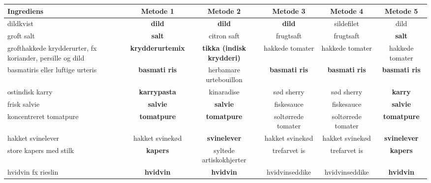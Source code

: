 \begin{table}
    \begin{tabular}{|p{2cm}|c|c|c|c|c|}
        \hline
        Ingrediens                                                 & Metode 1        & Metode 2                & Metode 3           & Metode 4           & Metode 5        \\ \hline
        dildkvist                                                  & \textbf{dild}            & \textbf{dild}                    & \textbf{dild}               & sildefilet         & dild            \\ \hline
        groft salt                                                 & \textbf{salt}            & citron saft             & frugtsaft          & frugtsaft          & \textbf{salt}            \\ \hline
        grofthakkede krydderurter, fx koriander, persille og dild & \textbf{krydderurtemix}  & \textbf{tikka (indisk krydderi)} & hakkede tomater    & hakkede tomater    & hakkede tomater \\ \hline
        basmatiris eller luftige urteris                           & \textbf{basmati ris}     & herbamare urtebouillon  & \textbf{basmati ris}        & \textbf{basmati ris}        & \textbf{basmati ris}     \\ \hline
        ostindisk karry                                            & \textbf{karrypasta}      & kinaradise              & sød sherry         & sød sherry         & \textbf{karry}           \\ \hline
        frisk salvie                                               & \textbf{salvie}          & \textbf{salvie}                  & fiskesauce         & fiskesauce         & \textbf{salvie}          \\ \hline
        koncentreret tomatpure                                     & \textbf{tomatpure}       & \textbf{tomatpure}               & soltørrede tomater & soltørrede tomater & \textbf{tomatpure}       \\ \hline
        hakket svinelever                                          & hakket svinekød & \textbf{svinelever}              & hakket svinekød    & hakket svinekød    & \textbf{svinelever}      \\ \hline
        store kapers med stilk                                     & \textbf{kapers}          & syltede artiskokhjerter & trefarvet is       & trefarvet is       & \textbf{kapers}          \\ \hline
        hvidvin fx rieslin                                         & \textbf{hvidvin}         & \textbf{hvidvin}                 & hvidvinseddike     & hvidvinseddike     & \textbf{hvidvin}         \\ \hline

\end{tabular}
\end{table}
